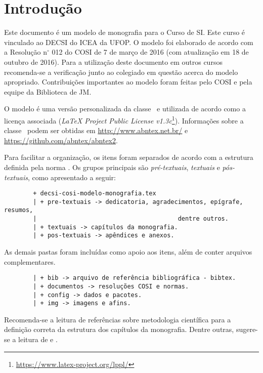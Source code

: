 \chapter{Introdução}
\label{cap:introducao}

Este documento é um modelo de monografia para o Curso de \acf{SI}. Este curso é vinculado ao \acf{DECSI} do \acf{ICEA} da \acf{UFOP}. O modelo foi elaborado de acordo com a Resolução n$^\circ$ 012 do \acf{COSI} de 7 de março de 2016 (com atualização em 18 de outubro de 2016). Para a utilização deste documento em outros cursos recomenda-se a verificação junto ao colegiado em questão acerca do modelo apropriado. Contribuições importantes ao modelo foram feitas pelo COSI e pela equipe da Biblioteca de \acf{JM}.

O modelo é uma versão personalizada da classe \abnTeX\ e utilizada de acordo como a licença associada (\textit{LaTeX Project Public License v1.3c}\footnote{\url{https://www.latex-project.org/lppl/}}). Informações sobre a classe \abnTeX\ podem ser obtidas em \url{http://www.abntex.net.br/} e \url{https://github.com/abntex/abntex2}.

Para facilitar a organização, os itens foram separados de acordo com a estrutura definida pela norma . Os grupos principais são \textit{pré-textuais}, \textit{textuais} e \textit{pós-textuais}, como apresentado a seguir:

\begin{verbatim}
		+ decsi-cosi-modelo-monografia.tex
		| + pre-textuais -> dedicatoria, agradecimentos, epígrafe, resumos,
		|										dentre outros.
		| + textuais -> capítulos da monografia.
		| + pos-textuais -> apêndices e anexos.
\end{verbatim}

As demais pastas foram incluídas como apoio aos itens, além de conter arquivos complementares.

\begin{verbatim}
		| + bib -> arquivo de referência bibliográfica - bibtex.
		| + documentos -> resoluções COSI e normas.
		| + config -> dados e pacotes.
		| + img -> imagens e afins.
\end{verbatim}

Recomenda-se a leitura de referências sobre metodologia científica para a definição correta da estrutura dos capítulos da monografia. Dentre outras, sugere-se a leitura de  e .

